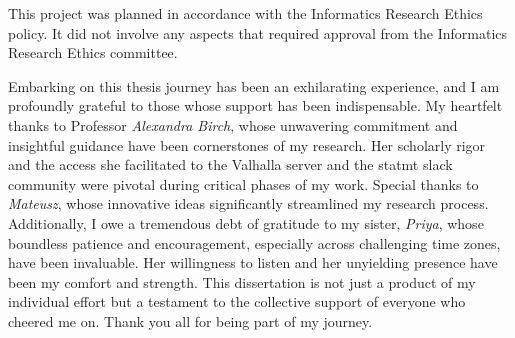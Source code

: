 \documentclass[logo,msc]{infthesis}           %
\begin{document}
\begin{preliminary}
\begin{ethics}
%
This project was planned in accordance with the Informatics Research
Ethics policy. It did not involve any aspects that required approval
from the Informatics Research Ethics committee.

\standarddeclaration
\end{ethics}


\begin{acknowledgements}
Embarking on this thesis journey has been an exhilarating experience, and I am profoundly grateful to those whose support has been indispensable. My heartfelt thanks to Professor \textit{Alexandra Birch}, whose unwavering commitment and insightful guidance have been cornerstones of my research. Her scholarly rigor and the access she facilitated to the Valhalla server and the statmt slack community were pivotal during critical phases of my work. Special thanks to \textit{Mateusz}, whose innovative ideas significantly streamlined my research process. Additionally, I owe a tremendous debt of gratitude to my sister, \textit{Priya}, whose boundless patience and encouragement, especially across challenging time zones, have been invaluable. Her willingness to listen and her unyielding presence have been my comfort and strength. This dissertation is not just a product of my individual effort but a testament to the collective support of everyone who cheered me on. Thank you all for being part of my journey.


\end{acknowledgements}
\end{preliminary}
\end{document}
